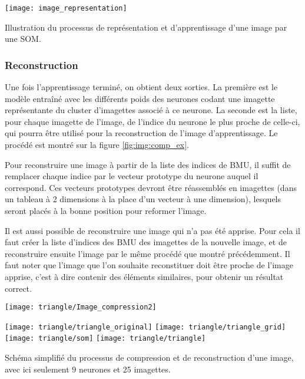 	\begin{figureth}
		\texttt{[image: image\_representation]}
		\caption[Représentation d'une image]{Illustration du processus de représentation et d'apprentissage d'une image par une SOM.}\label{fig:img:dec}
	\end{figureth}

	\subsubsection{Reconstruction}

	Une fois l'apprentissage terminé, on obtient deux sorties. La première est le modèle entraîné avec les différents poids des neurones codant une imagette représentante du cluster d'imagettes associé à ce neurone. La seconde est la liste, pour chaque imagette de l'image, de l'indice du neurone le plus proche de celle-ci, qui pourra être utilisé pour la reconstruction de l'image d'apprentissage. Le procédé est montré sur la figure \ref{fig:img:comp_ex}.

	Pour reconstruire une image à partir de la liste des indices de BMU, il suffit de remplacer chaque indice par le vecteur prototype du neurone auquel il correspond. Ces vecteurs prototypes devront être réassemblés en imagettes (dans un tableau à 2 dimensions à la place d'un vecteur à une dimension), lesquels seront placés à la bonne position pour reformer l'image.

	Il est aussi possible de reconstruire une image qui n'a pas été apprise. Pour cela il faut créer la liste d'indices des BMU des imagettes de la nouvelle image, et de reconstruire ensuite l'image par le même procédé que montré précédemment. Il faut noter que l'image que l'on souhaite reconstituer doit être proche de l'image apprise, c'est à dire contenir des éléments similaires, pour obtenir un résultat correct.

	\begin{figureth}
		\begin{subfigureth}{\textwidth}
			\texttt{[image: triangle/Image\_compression2]}
		\end{subfigureth}
		\begin{subfigureth}{\textwidth}
			\texttt{[image: triangle/triangle\_original]}\hfill
			\texttt{[image: triangle/triangle\_grid]}\hfill
			\texttt{[image: triangle/som]}\hfill
			\texttt{[image: triangle/triangle]}
		\end{subfigureth}
		\caption[Compression et décompression d'image]{Schéma simplifié du processus de compression et de reconstruction d'une image, avec ici seulement 9 neurones et 25 imagettes.}\label{fig:img:comp_ex}
	\end{figureth}

